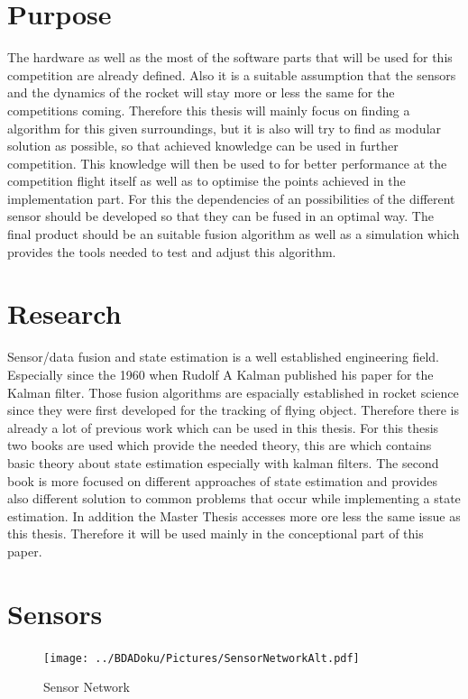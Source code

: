  \section{Purpose}
 The hardware as well as the most of the software parts that will be used for this competition are already defined.
 Also it is a suitable assumption that the sensors and the dynamics of the rocket will stay more or less the same for the competitions coming.
 Therefore this thesis will mainly focus on finding a algorithm for this given surroundings, but it is also will try to find as modular solution as possible, 
 so that achieved knowledge can be used in further competition. 
 This knowledge will then be used to for better performance at the competition flight itself as well as to optimise the points achieved in the implementation part.
 For this the dependencies of an possibilities of the different sensor should be developed so that they can be fused in an optimal way.
 The final product should be an suitable fusion algorithm as well as a simulation which provides the tools needed to test and adjust this algorithm.
  
 \section{Research}
 Sensor/data fusion and state estimation is a well established engineering field.
 Especially since the 1960 when Rudolf A Kalman published his paper for the Kalman filter.
 Those fusion algorithms are espacially established in rocket science since they were first developed for the tracking of flying object.
 Therefore there is already a lot of previous work which can be used in this thesis.
 For this thesis two books are used which provide the needed theory, this are 
 \cite{DavidWSchultz2004} which contains basic theory about state estimation especially with kalman filters. The second book
 \cite{SimonDan2006Ose:} is more focused on different approaches of state estimation and
 provides also different solution to common problems that occur while implementing a state estimation.
 In addition the Master Thesis \cite{BryanTongMinh2012} accesses more ore less the same issue as this thesis.
 Therefore it will be used mainly in the conceptional part of this paper.
 
 \section{Sensors}
 \begin{figure}[h!]
  \centering
  \texttt{[image: ../BDADoku/Pictures/SensorNetworkAlt.pdf]}
  \caption{Sensor Network}
  \label{fig:SensorNetwork}
 \end{figure}

